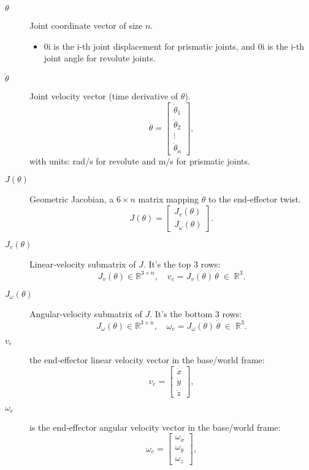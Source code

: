 \documentclass[12pt]{article}
\begin{document}
\begin{description}
  \item[$\theta$]%
    Joint coordinate vector of size $n$.
    \begin{itemize}
      \item 0i is the i-th joint displacement for prismatic joints, and 0i is the i-th joint angle for revolute joints.
    \end{itemize}

  \item[$\dot{\theta}$]%
    Joint velocity vector (time derivative of $\theta$).
    \[
      \dot{\theta} = \begin{bmatrix}
        \dot{\theta}_1 \\ \dot{\theta}_2 \\ \vdots \\ \dot{\theta}_n
      \end{bmatrix},
    \] 
    with units: rad/s for revolute and m/s for prismatic joints.

  \item[$J(\theta)$]%
    Geometric Jacobian, a $6\times n$ matrix mapping $\dot\theta$ to the end-effector twist.
    \[
      J(\theta) = 
      \begin{bmatrix}
        J_v(\theta) \\[6pt]
        J_\omega(\theta)
      \end{bmatrix}.
    \]

  \item[$J_v(\theta)$]%
    Linear‐velocity submatrix of $J$. It’s the top 3 rows:
    \[
      J_v(\theta) \in \mathbb{R}^{3\times n},
      \quad
      v_e = J_v(\theta)\,\dot\theta
      \;\in\; \mathbb{R}^3.
    \]

  \item[$J_\omega(\theta)$]%
    Angular‐velocity submatrix of $J$. It’s the bottom 3 rows:
    \[
      J_\omega(\theta) \in \mathbb{R}^{3\times n},
      \quad
      \omega_e = J_\omega(\theta)\,\dot\theta
      \;\in\; \mathbb{R}^3.
    \]

  \item[$v_e$] the end‐effector linear velocity vector in the base/world frame:
    \[
      v_e = \begin{bmatrix} \dot{x} \\ \dot{y} \\ \dot{z} \end{bmatrix},
    \]

  \item[$\omega_e$]is the end‐effector angular velocity vector in the base/world frame:
    \[
      \omega_e = \begin{bmatrix} \omega_x \\ \omega_y \\ \omega_z \end{bmatrix},
    \]
\end{description}
\end{document}
